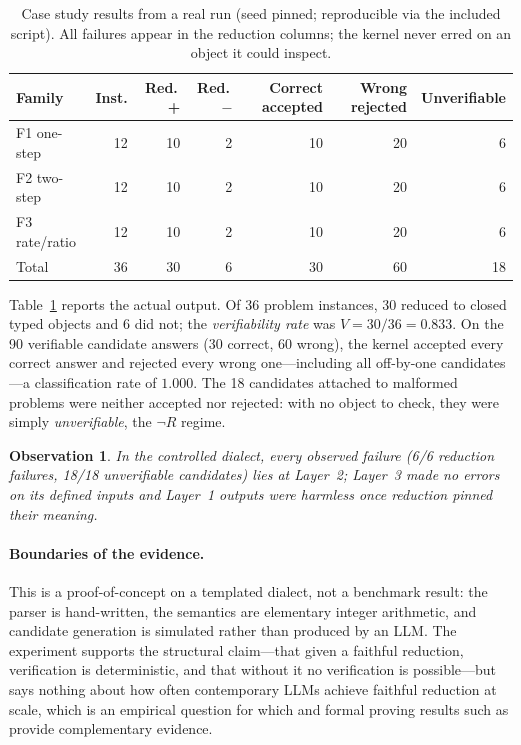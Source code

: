 \documentclass[11pt,a4paper]{article}
\theoremstyle{plain}
\newtheorem{observation}{Observation}
\theoremstyle{definition}
\theoremstyle{remark}
\begin{document}
\begin{table}[t]
\centering
\caption{Case study results from a real run (seed pinned; reproducible via
the included script). All failures appear in the reduction columns; the
kernel never erred on an object it could inspect.}
\label{tab:casestudy}
\small
\begin{tabular}{@{}lrrrrrr@{}}
\toprule
\textbf{Family} & \textbf{Inst.} & \textbf{Red.\,+} & \textbf{Red.\,$-$}
 & \textbf{Correct accepted} & \textbf{Wrong rejected} & \textbf{Unverifiable}\\
\midrule
F1 one-step   & 12 & 10 & 2 & 10 & 20 & 6\\
F2 two-step   & 12 & 10 & 2 & 10 & 20 & 6\\
F3 rate/ratio & 12 & 10 & 2 & 10 & 20 & 6\\
\midrule
Total         & 36 & 30 & 6 & 30 & 60 & 18\\
\bottomrule
\end{tabular}
\end{table}

Table~\ref{tab:casestudy} reports the actual output. Of 36 problem
instances, 30 reduced to closed typed objects and 6 did not; the
\emph{verifiability rate} was $V=30/36=0.833$. On the 90 verifiable
candidate answers (30 correct, 60 wrong), the kernel accepted every
correct answer and rejected every wrong one---including all off-by-one
candidates---a classification rate of $1.000$. The 18 candidates attached
to malformed problems were neither accepted nor rejected: with no object to
check, they were simply \emph{unverifiable}, the $\neg R$ regime.

\begin{observation}\label{obs:case}
In the controlled dialect, every observed failure (6/6 reduction failures,
18/18 unverifiable candidates) lies at Layer~2; Layer~3 made no errors on
its defined inputs and Layer~1 outputs were harmless once reduction pinned
their meaning.
\end{observation}

\paragraph{Boundaries of the evidence.}
This is a proof-of-concept on a templated dialect, not a benchmark result:
the parser is hand-written, the semantics are elementary integer
arithmetic, and candidate generation is simulated rather than produced by
an LLM. The experiment supports the structural claim---that given a
faithful reduction, verification is deterministic, and that without it no
verification is possible---but says nothing about how often contemporary
LLMs achieve faithful reduction at scale, which is an empirical question
for which \citep{mirzadeh2024gsmsymbolic} and formal proving results such
as \citep{hubert2025alphaproof} provide complementary evidence.
\end{document}
